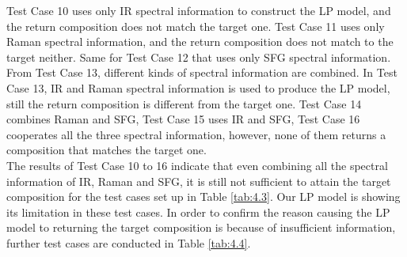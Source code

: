 Test Case 10 uses only IR spectral information to construct the LP model, and the return composition does not match the target one. Test Case 11 uses only Raman spectral information, and the return composition does not match to the target neither. Same for Test Case 12 that uses only SFG spectral information. From Test Case 13, different kinds of spectral information are combined. In Test Case 13, IR and Raman spectral information is used to produce the LP model, still the return composition is different from the target one. Test Case 14 combines Raman and SFG, Test Case 15 uses IR and SFG, Test Case 16 cooperates all the three spectral information, however, none of them returns a composition that matches the target one. \\

The results of Test Case 10 to 16 indicate that even combining all the spectral information of IR, Raman and SFG, it is still not sufficient to attain the target composition for the test cases set up in Table \ref{tab:4.3}. Our LP model is showing its limitation in these test cases. In order to confirm the reason causing the LP model to returning the target composition is because of insufficient information, further test cases are conducted in Table \ref{tab:4.4}. \\

